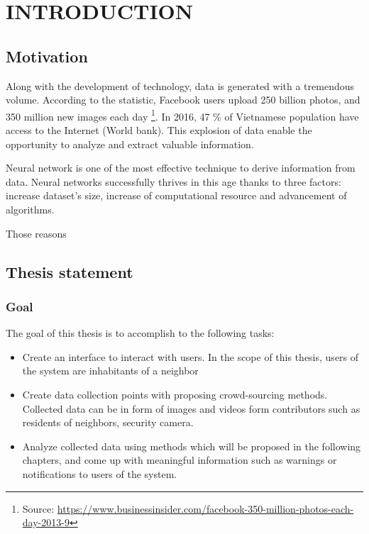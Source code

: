 \chapter{INTRODUCTION}
\label{introduction}
\section{Motivation}
Along with the development of technology, data is generated with a tremendous volume. According to the statistic, Facebook users upload 250 billion photos, and 350 million new images each day \footnote{Source: \url{https://www.businessinsider.com/facebook-350-million-photos-each-day-2013-9}}. In 2016, 47 \% of Vietnamese population have access to the Internet (World bank). This explosion of data enable the opportunity to analyze and extract valuable information.

Neural network is one of the most effective technique to derive information from data. Neural networks successfully thrives in this age thanks to three factors: increase dataset's size, increase of computational resource and advancement of algorithms.

Those reasons 
 
\section{Thesis statement}
\subsection{Goal}
The goal of this thesis is to accomplish to the following tasks:
\begin{itemize}
	\item Create an interface to interact with users. In the scope of this thesis, users of the system are inhabitants of a neighbor
	\item Create data collection points with proposing crowd-sourcing methods. Collected data can be in form of images and videos form contributors such as residents of neighbors, security camera.
	\item Analyze collected data using methods which will be proposed in the following chapters, and come up with meaningful information such as warnings or notifications to users of the system.
\end{itemize} 


